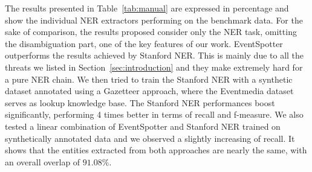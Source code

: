 \documentclass[10pt,a4paper]{article}
\begin{document}
The results presented in Table~\ref{tab:manual} are expressed in percentage and show the individual NER extractors performing on the benchmark data. For the sake of comparison, the results proposed consider only the NER task, omitting the disambiguation part, one of the key features of our work. EventSpotter outperforms the results achieved by Stanford NER. This is mainly due to all the threats we listed in Section~\ref{sec:introduction} and they make extremely hard for a pure NER chain. We then tried to train the Stanford NER with a synthetic dataset annotated using a Gazetteer approach, where the Eventmedia dataset serves as lookup knowledge base. The Stanford NER performances boost significantly, performing 4 times better in terms of recall and f-measure. We also tested a linear combination of EventSpotter and Stanford NER trained on synthetically annotated data and we observed a slightly increasing of recall. It shows that the entities extracted from both approaches are nearly the same, with an overall overlap of $91.08\%$.
\end{document}
